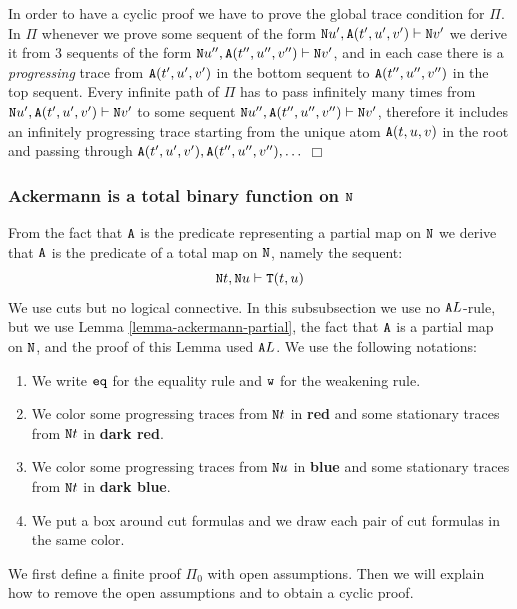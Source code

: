 \documentclass[a4paper,12pt]{article}
\newenvironment{proof}[1][Proof]{\begin{trivlist}
\item[\hskip \labelsep {\bfseries #1}]}{\end{trivlist}}
\newcommand{\Nat}               { {\tt N}  }
\newcommand{\eq}              { {\tt eq} }
\newcommand{\Tot}           { {\tt T} }
\newcommand{\Ack}   {{\tt A}}
\newcommand{\Weak} { {\tt w} }
\begin{document}
\begin{proof}
In order to have a cyclic proof we have to prove the global trace condition for $\Pi$. 
In $\Pi$ whenever we prove some
sequent of the form $\Nat u', \Ack(t',u',v') \vdash \Nat v'$ we derive it from $3$ sequents of the 
form $\Nat u'', \Ack(t'',u'',v'') \vdash \Nat v'$, and in each case there is a \emph{progressing} 
trace from $\Ack(t',u',v') $ in the bottom sequent to $\Ack(t'',u'',v'') $ in the top sequent. 
Every infinite path of $\Pi$ has to pass infinitely many times from  
$\Nat u', \Ack(t',u',v') \vdash \Nat v'$ to some sequent 
$\Nat u'', \Ack(t'',u'',v'') \vdash \Nat v'$, therefore it includes an infinitely progressing trace 
starting from the unique atom $\Ack(t,u,v) $ in the root and passing through
$\Ack(t',u',v') , \Ack(t'',u'',v''), \ldots$
$\Box$ \end{proof}


\subsubsection{Ackermann is a total binary function on $\Nat$}
From the fact that $\Ack$ is the predicate representing a partial map on $\Nat$ we derive that 
$\Ack$ is the predicate of a total map on $\Nat$, namely the sequent:
$$\Nat t, \Nat u \vdash \Tot(t,u)$$
We use cuts but no logical connective.
In this subsubsection we use no $\Ack L$-rule, 
but we use Lemma \ref{lemma-ackermann-partial}, the fact that $\Ack$ is
a partial map on $\Nat$, and the proof of this Lemma used $\Ack L$.
We use the following notations:

\begin{enumerate}
\item
We write $\eq$ for the equality rule and $\Weak$ for the weakening rule.
\item
We color some progressing traces from $\Nat t$
in {\bf \color{red}red} and some stationary traces from $\Nat t$
in {\bf \color{darkred} dark red}. 
\item
We color some progressing traces from $\Nat u$
in {\bf \color{blue}blue} and some stationary traces from $\Nat t$
in {\bf \color{darkblue} dark blue}. 
\item
We put a box around cut formulas and we draw each pair of cut formulas in the same color.
\end{enumerate}

We first define a finite proof $\Pi_0$ with open assumptions. Then we will
explain how to remove the open assumptions and to obtain a cyclic proof.
\end{document}
